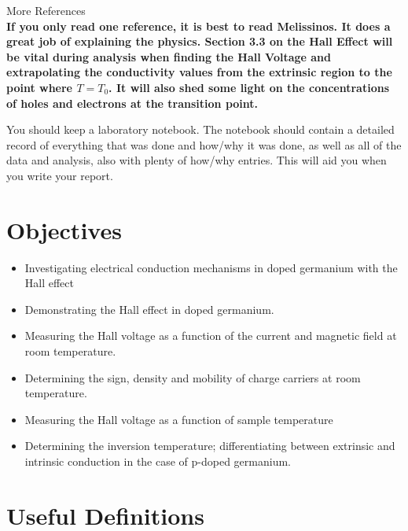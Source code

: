 \documentclass{../lab}
\begin{document}
\noindent More References \\

\noindent\textbf{If you only read one reference, it is best to read Melissinos. It does a great job of explaining the physics. Section 3.3 on the Hall Effect will be vital during analysis when finding the Hall Voltage and extrapolating the conductivity values from the extrinsic region to the point where $T = T_0$. It will also shed some light on the concentrations of holes and electrons at the transition point.}

You should keep a laboratory notebook. The notebook should contain a detailed record of everything that was done and how/why it was done, as well as all of the data and analysis, also with plenty of how/why entries. This will aid you when you write your report.

\section{Objectives}

\begin{itemize}
    \item Investigating electrical conduction mechanisms in doped germanium with the Hall effect
    \item Demonstrating the Hall effect in doped germanium.
    \item Measuring the Hall voltage as a function of the current and magnetic field at room temperature.
    \item Determining the sign, density and mobility of charge carriers at room temperature.
    \item Measuring the Hall voltage as a function of sample temperature
    \item Determining the inversion temperature; differentiating between extrinsic and intrinsic conduction in the case of p-doped germanium.
\end{itemize}

\section{Useful Definitions}
\end{document}
